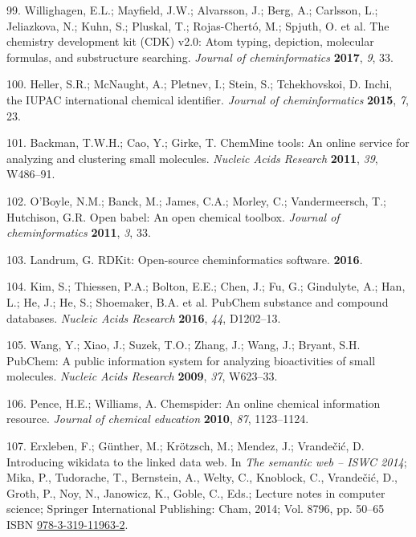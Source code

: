 \documentclass[]{article}
\begin{document}
\leavevmode\hypertarget{ref-willighagen_2017}{}%
99. Willighagen, E.L.; Mayfield, J.W.; Alvarsson, J.; Berg, A.; Carlsson, L.; Jeliazkova, N.; Kuhn, S.; Pluskal, T.; Rojas-Chertó, M.; Spjuth, O. et al. The chemistry development kit (CDK) v2.0: Atom typing, depiction, molecular formulas, and substructure searching. \emph{Journal of cheminformatics} \textbf{2017}, \emph{9}, 33.

\leavevmode\hypertarget{ref-heller_2015}{}%
100. Heller, S.R.; McNaught, A.; Pletnev, I.; Stein, S.; Tchekhovskoi, D. Inchi, the IUPAC international chemical identifier. \emph{Journal of cheminformatics} \textbf{2015}, \emph{7}, 23.

\leavevmode\hypertarget{ref-backman_2011}{}%
101. Backman, T.W.H.; Cao, Y.; Girke, T. ChemMine tools: An online service for analyzing and clustering small molecules. \emph{Nucleic Acids Research} \textbf{2011}, \emph{39}, W486--91.

\leavevmode\hypertarget{ref-oboyle_2011}{}%
102. O'Boyle, N.M.; Banck, M.; James, C.A.; Morley, C.; Vandermeersch, T.; Hutchison, G.R. Open babel: An open chemical toolbox. \emph{Journal of cheminformatics} \textbf{2011}, \emph{3}, 33.

\leavevmode\hypertarget{ref-landrum_2016}{}%
103. Landrum, G. RDKit: Open-source cheminformatics software. \textbf{2016}.

\leavevmode\hypertarget{ref-kim_2016}{}%
104. Kim, S.; Thiessen, P.A.; Bolton, E.E.; Chen, J.; Fu, G.; Gindulyte, A.; Han, L.; He, J.; He, S.; Shoemaker, B.A. et al. PubChem substance and compound databases. \emph{Nucleic Acids Research} \textbf{2016}, \emph{44}, D1202--13.

\leavevmode\hypertarget{ref-wang_2009}{}%
105. Wang, Y.; Xiao, J.; Suzek, T.O.; Zhang, J.; Wang, J.; Bryant, S.H. PubChem: A public information system for analyzing bioactivities of small molecules. \emph{Nucleic Acids Research} \textbf{2009}, \emph{37}, W623--33.

\leavevmode\hypertarget{ref-pence_2010}{}%
106. Pence, H.E.; Williams, A. Chemspider: An online chemical information resource. \emph{Journal of chemical education} \textbf{2010}, \emph{87}, 1123--1124.

\leavevmode\hypertarget{ref-erxleben_2014}{}%
107. Erxleben, F.; Günther, M.; Krötzsch, M.; Mendez, J.; Vrandečić, D. Introducing wikidata to the linked data web. In \emph{The semantic web -- ISWC 2014}; Mika, P., Tudorache, T., Bernstein, A., Welty, C., Knoblock, C., Vrandečić, D., Groth, P., Noy, N., Janowicz, K., Goble, C., Eds.; Lecture notes in computer science; Springer International Publishing: Cham, 2014; Vol. 8796, pp. 50--65 ISBN \href{https://worldcat.org/isbn/978-3-319-11963-2}{978-3-319-11963-2}.
\end{document}
